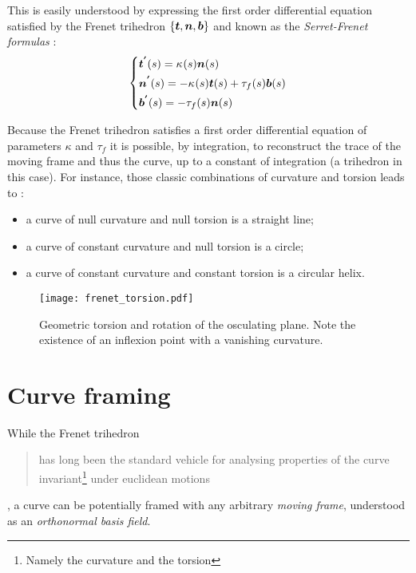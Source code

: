 This is easily understood by expressing the first order differential equation satisfied by the Frenet trihedron $\{\boldsymbol{t},\boldsymbol{n},\boldsymbol{b}\}$ and known as the \emph{Serret-Frenet formulas} :
\begin{equation}
	\left\{
	\begin{aligned}
		&\boldsymbol{t^{'}}(s) 	=  \kappa_{}(s) \boldsymbol{n}(s)\\
		&\boldsymbol{n^{'}}(s) 	=  -\kappa_{}(s) \boldsymbol{t}(s) + \tau_f(s) \boldsymbol{b}(s) \\
		&\boldsymbol{b^{'}}(s) 	=  -\tau_f(s) \boldsymbol{n}(s) \\
	\end{aligned}
	\right.
\end{equation}

Because the Frenet trihedron satisfies a first order differential equation of parameters $\kappa$ and $\tau_f$ it is possible, by integration, to reconstruct the trace of the moving frame and thus the curve, up to a constant of integration (a trihedron in this case). For instance, those classic combinations of curvature and torsion leads to :
\begin{itemize}
	\item a curve of null curvature and null torsion is a straight line;
	\item a curve of constant curvature and null torsion is a circle;
	\item a curve of constant curvature and constant torsion is a circular helix.
\end{itemize}

\begin{figure}[t]
	\centering
	\texttt{[image: frenet\_torsion.pdf]}
	\caption{Geometric torsion and rotation of the osculating plane. Note the existence of an inflexion point with a vanishing curvature.}
	\label{fig:3_3}
\end{figure}



\section{Curve framing}

While the Frenet trihedron \blockcquote[p.1]{Bishop1975}{has long been the standard vehicle for analysing properties of the curve invariant\footnote{Namely the curvature and the torsion} under euclidean motions}, a curve can be potentially framed with any arbitrary \emph{moving frame}, understood as an \emph{orthonormal basis field}.

